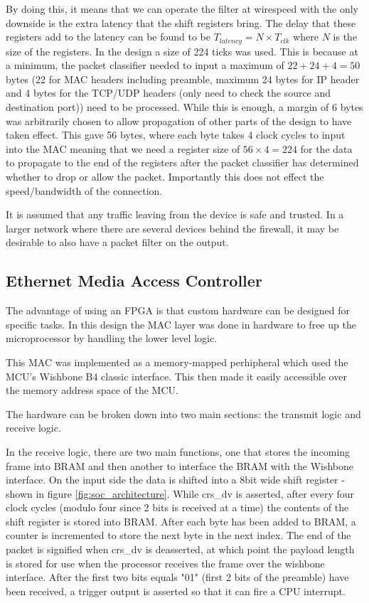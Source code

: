 By doing this, it means that we can operate the filter at wirespeed with the only downside is the extra latency that the shift registers bring. The delay that these registers add to the latency can be found to be $T_{latency} = N\times T_{clk}$ where $N$ is the size of the registers. In the design a size of 224 ticks was used. This is because at a minimum, the packet classifier needed to input a maximum of $22 + 24 + 4 = 50$ bytes (22 for MAC headers including preamble, maximum 24 bytes for IP header and 4 bytes for the TCP/UDP headers (only need to check the source and destination port)) need to be processed. While this is enough, a margin of 6 bytes was arbitrarily chosen to allow propagation of other parts of the design to have taken effect. This gave 56 bytes, where each byte takes 4 clock cycles to input into the MAC meaning that we need a register size of $56 \times 4=224$ for the data to propagate to the end of the registers after the packet classifier has determined whether to drop or allow the packet. Importantly this does not effect the speed/bandwidth of the connection. 


It is assumed that any traffic leaving from the device is safe and trusted. In a larger network where there are several devices behind the firewall, it may be desirable to also have a packet filter on the output. 










\subsection{Ethernet Media Access Controller}
\label{sec:ethernet_mac}
The advantage of using an FPGA is that custom hardware can be designed for specific tasks. In this design the MAC layer was done in hardware to free up the microprocessor by handling the lower level logic. 

This MAC was implemented as a memory-mapped perhipheral which used the MCU's Wishbone B4 classic interface. This then made it easily accessible over the memory address space of the MCU.  



The hardware can be broken down into two main sections: the transmit logic and receive logic. 

In the receive logic, there are two main functions, one that stores the incoming frame into BRAM and then another to interface the BRAM with the Wishbone interface. On the input side the data is shifted into a 8bit wide shift register - shown in figure \ref{fig:soc_architecture}. While crs\_dv is asserted, after every four clock cycles (modulo four since 2 bits is received at a time) the contents of the shift register is stored into BRAM. After each byte has been added to BRAM, a counter is incremented to store the next byte in the next index. The end of the packet is signified when crs\_dv is deasserted, at which point the payload length is stored for use when the processor receives the frame over the wishbone interface. After the first two bits equals "01" (first 2 bits of the preamble) have been received, a trigger output is asserted so that it can fire a CPU interrupt.

